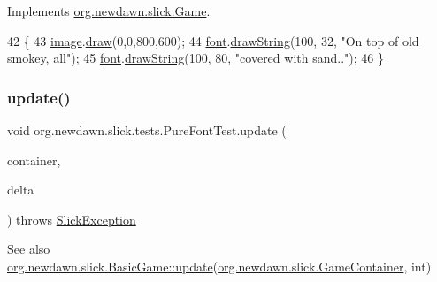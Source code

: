 Implements \mbox{\hyperlink{interfaceorg_1_1newdawn_1_1slick_1_1_game_af1a4670d43eb3ba04dfcf55ab1975b64}{org.\+newdawn.\+slick.\+Game}}.


\begin{DoxyCode}
42                                                             \{
43         \mbox{\hyperlink{classorg_1_1newdawn_1_1slick_1_1tests_1_1_pure_font_test_abf4f2b16a8b53a263efe45591327f0b0}{image}}.\mbox{\hyperlink{classorg_1_1newdawn_1_1slick_1_1_image_a9bddcca05c7140ab45df8ac5b250b6cd}{draw}}(0,0,800,600);
44         \mbox{\hyperlink{classorg_1_1newdawn_1_1slick_1_1tests_1_1_pure_font_test_a6a077c1e23810818363d7a01a69ddd82}{font}}.\mbox{\hyperlink{interfaceorg_1_1newdawn_1_1slick_1_1_font_a40b19381efcb64ce1ce4d446eff1e350}{drawString}}(100, 32, \textcolor{stringliteral}{"On top of old smokey, all"});
45         \mbox{\hyperlink{classorg_1_1newdawn_1_1slick_1_1tests_1_1_pure_font_test_a6a077c1e23810818363d7a01a69ddd82}{font}}.\mbox{\hyperlink{interfaceorg_1_1newdawn_1_1slick_1_1_font_a40b19381efcb64ce1ce4d446eff1e350}{drawString}}(100, 80, \textcolor{stringliteral}{"covered with sand.."});
46     \}
\end{DoxyCode}
\mbox{\label{classorg_1_1newdawn_1_1slick_1_1tests_1_1_pure_font_test_a87f85cc4bba2ae7c3ffdcdd62a8c387a}} 
\subsubsection{\texorpdfstring{update()}{update()}}
{\footnotesize\ttfamily void org.\+newdawn.\+slick.\+tests.\+Pure\+Font\+Test.\+update (\begin{DoxyParamCaption}\item[{\mbox{\hyperlink{classorg_1_1newdawn_1_1slick_1_1_game_container}{Game\+Container}}}]{container,  }\item[{int}]{delta }\end{DoxyParamCaption}) throws \mbox{\hyperlink{classorg_1_1newdawn_1_1slick_1_1_slick_exception}{Slick\+Exception}}\hspace{0.3cm}{\ttfamily [inline]}}

\begin{DoxySeeAlso}{See also}
\mbox{\hyperlink{classorg_1_1newdawn_1_1slick_1_1_basic_game_acfe6fa05aef83bff1631af91a3e4bd20}{org.\+newdawn.\+slick.\+Basic\+Game\+::update}}(\mbox{\hyperlink{classorg_1_1newdawn_1_1slick_1_1_game_container}{org.\+newdawn.\+slick.\+Game\+Container}}, int) 
\end{DoxySeeAlso}


